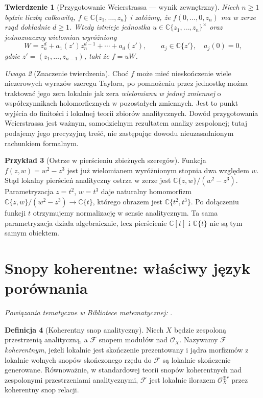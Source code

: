 \documentclass[11pt,a4paper,openany]{report}
\numberwithin{equation}{section}
\theoremstyle{plain}
\newtheorem{twierdzenie}{Twierdzenie}[section]
\theoremstyle{definition}
\newtheorem{definicja}[twierdzenie]{Definicja}
\newtheorem{przyklad}[twierdzenie]{Przykład}
\theoremstyle{remark}
\newtheorem{uwaga}[twierdzenie]{Uwaga}
\newcommand{\C}{\mathbb C}
\begin{document}
\begin{twierdzenie}[Przygotowanie Weierstrassa — wynik zewnętrzny]
\label{tw:ga9-weierstrass}
Niech $n\ge1$ będzie liczbą całkowitą,
$f\in\C\{z_1,\ldots,z_n\}$ i załóżmy, że
$f(0,\ldots,0,z_n)$ ma w zerze rząd dokładnie $d\ge1$.
Wtedy istnieje jednostka $u\in\C\{z_1,\ldots,z_n\}^\times$
oraz jednoznaczny wielomian wyróżniony
\[
 W=z_n^d+a_1(z')z_n^{d-1}+\cdots+a_d(z'),
 \qquad a_j\in\C\{z'\},\quad a_j(0)=0,
\]
gdzie $z'=(z_1,\ldots,z_{n-1})$, taki że $f=uW$.
\end{twierdzenie}

\begin{uwaga}[Znaczenie twierdzenia]
Choć $f$ może mieć nieskończenie wiele niezerowych wyrazów
szeregu Taylora, po pomnożeniu przez jednostkę można traktować
jego zera lokalnie jak zera \emph{wielomianu w jednej zmiennej}
o współczynnikach holomorficznych w pozostałych zmiennych.
Jest to punkt wyjścia do finitości i lokalnej teorii zbiorów
analitycznych. Dowód przygotowania Weierstrassa jest ważnym,
samodzielnym rezultatem analizy zespolonej; tutaj podajemy jego
precyzyjną treść, nie zastępując dowodu nieuzasadnionym
rachunkiem formalnym.
\end{uwaga}

\begin{przyklad}[Ostrze w pierścieniu zbieżnych szeregów]
Funkcja $f(z,w)=w^2-z^3$ jest już wielomianem wyróżnionym
stopnia dwa względem $w$. Stąd lokalny pierścień analityczny
ostrza w zerze jest $\C\{z,w\}/(w^2-z^3)$.
Parametryzacja $z=t^2$, $w=t^3$ daje naturalny homomorfizm
$\C\{z,w\}/(w^2-z^3)\to\C\{t\}$, którego obrazem jest
$\C\{t^2,t^3\}$. Po dołączeniu funkcji $t$ otrzymujemy
normalizację w sensie analitycznym. Ta sama parametryzacja
działa algebraicznie, lecz pierścienie $\C[t]$ i $\C\{t\}$
nie są tym samym obiektem.
\end{przyklad}

\section{Snopy koherentne: właściwy język porównania}
\label{sec:ga9-koherentne}

\noindent\emph{Powiązania tematyczne w Bibliotece matematycznej:} .


\begin{definicja}[Koherentny snop analityczny]
Niech $X$ będzie zespoloną przestrzenią analityczną,
a $\mathcal F$ snopem modułów nad $\mathcal O_X$.
Nazywamy $\mathcal F$ \emph{koherentnym}, jeżeli lokalnie
jest skończenie prezentowany i jądra morfizmów z lokalnie
wolnych snopów skończonego rzędu do $\mathcal F$ są lokalnie
skończenie generowane. Równoważnie, w standardowej teorii
snopów koherentnych nad zespolonymi przestrzeniami
analitycznymi, $\mathcal F$ jest lokalnie ilorazem
$\mathcal O_X^{\oplus r}$ przez koherentny snop relacji.
\end{definicja}
\end{document}
